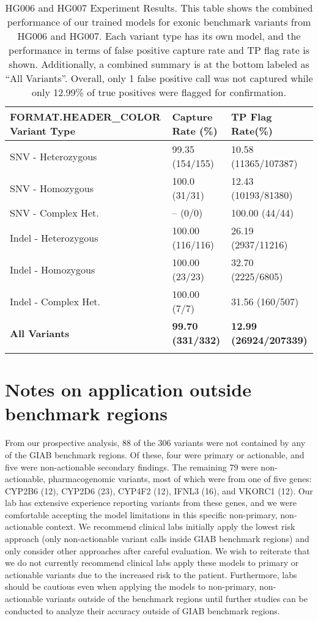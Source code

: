 \begin{longtable}{|l|p{}|p{}|}
    \hline
    {{ FORMAT.HEADER_COLOR }}
    \textbf{Variant Type}&\textbf{Capture Rate (\%)}&\textbf{TP Flag Rate(\%)} \\ \hline
    SNV - Heterozygous&99.35 (154/155)&10.58 (11365/107387) \\ \hline
    SNV - Homozygous&100.0 (31/31)&12.43 (10193/81380) \\ \hline
    SNV - Complex Het.&-- (0/0)&100.00 (44/44) \\ \hline
    Indel - Heterozygous&100.00 (116/116)&26.19 (2937/11216) \\ \hline
    Indel - Homozygous&100.00 (23/23)&32.70 (2225/6805) \\ \hline
    Indel - Complex Het.&100.00 (7/7)&31.56 (160/507) \\ \hline
    \textbf{All Variants}&\textbf{99.70 (331/332)}&\textbf{12.99 (26924/207339)} \\ \hline
    \caption{
        HG006 and HG007 Experiment Results.
        This table shows the combined performance of our trained models for exonic benchmark variants from HG006 and HG007.
        Each variant type has its own model, and the performance in terms of false positive capture rate and TP flag rate is shown.
        Additionally, a combined summary is at the bottom labeled as ``All Variants''.
        Overall, only 1 false positive call was not captured while only 12.99\% of true positives were flagged for confirmation.
    }
    \label{tab:final_hg67_performance}
\end{longtable}

\section{Notes on application outside benchmark regions}
From our prospective analysis, 88 of the 306 variants were not contained by any of the GIAB benchmark regions.  
Of these, four were primary or actionable, and five were non-actionable secondary findings.  
The remaining 79 were non-actionable, pharmacogenomic variants, most of which were from one of five genes: CYP2B6 (12), CYP2D6 (23), CYP4F2 (12), IFNL3 (16), and VKORC1 (12).  
Our lab has extensive experience reporting variants from these genes, and we were comfortable accepting the model limitations in this specific non-primary, non-actionable context.  
We recommend clinical labs initially apply the lowest risk approach (only non-actionable variant calls inside GIAB benchmark regions) and only consider other approaches after careful evaluation. 
We wish to reiterate that we do not currently recommend clinical labs apply these models to primary or actionable variants due to the increased risk to the patient.  
Furthermore, labs should be cautious even when applying the models to non-primary, non-actionable variants outside of the benchmark regions until further studies can be conducted to analyze their accuracy outside of GIAB benchmark regions. 